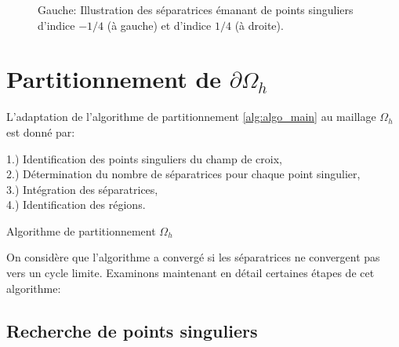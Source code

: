 \begin{figure}[!h]
  \caption{Gauche: Illustration des séparatrices émanant de points singuliers d'indice $-1/4$ (à gauche) et d'indice $1/4$ (à droite).}
  \label{fig:separatrice_illustration}
\end{figure}

\section{Partitionnement de $\partial\Omega_h$}

L'adaptation de l'algorithme de partitionnement \ref{alg:algo_main} au maillage $\Omega_h$ est donné par:\\

\begin{algorithm}[H]
\label{alg:discr_algo_main}
\vspace{0.2cm}
1.) Identification des points singuliers du champ de croix,\\\vspace{0.2cm}
2.) Détermination du nombre de séparatrices pour chaque point singulier,\\\vspace{0.2cm}
3.) Intégration des séparatrices,\\\vspace{0.2cm}
4.) Identification des régions.\\\vspace{0.2cm}
\caption{Algorithme de partitionnement $\Omega_h$}
\end{algorithm}
\vspace{0.5cm}
On considère que l'algorithme a convergé si les séparatrices ne convergent pas vers un cycle limite. Examinons maintenant en détail certaines étapes de cet algorithme:

\subsection{Recherche de points singuliers}

